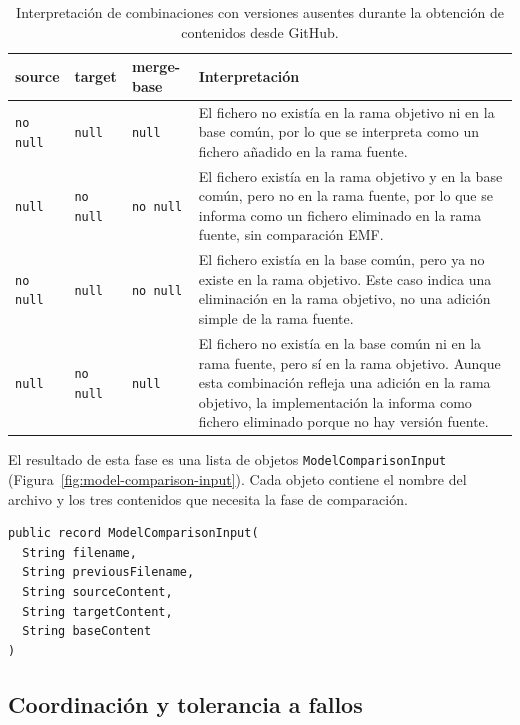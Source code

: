 \documentclass[11pt]{article}
\begin{document}
\begin{table}[h]
\centering
\begin{tabular}{|p{}|p{}|p{}|p{}|}
\hline
\textbf{source} & \textbf{target} & \textbf{merge-base} & \textbf{Interpretación} \\
\hline
\texttt{no null} & \texttt{null} & \texttt{null} & El fichero no existía en la rama objetivo ni en la base común, por lo que se interpreta como un fichero añadido en la rama fuente. \\
\hline
\texttt{null} & \texttt{no null} & \texttt{no null} & El fichero existía en la rama objetivo y en la base común, pero no en la rama fuente, por lo que se informa como un fichero eliminado en la rama fuente, sin comparación EMF. \\
\hline
\texttt{no null} & \texttt{null} & \texttt{no null} & El fichero existía en la base común, pero ya no existe en la rama objetivo. Este caso indica una eliminación en la rama objetivo, no una adición simple de la rama fuente. \\
\hline
\texttt{null} & \texttt{no null} & \texttt{null} & El fichero no existía en la base común ni en la rama fuente, pero sí en la rama objetivo. Aunque esta combinación refleja una adición en la rama objetivo, la implementación la informa como fichero eliminado porque no hay versión fuente. \\
\hline
\end{tabular}
\caption{Interpretación de combinaciones con versiones ausentes durante la obtención de contenidos desde GitHub.}
\label{tab:null-file-versions}
\end{table}

El resultado de esta fase es una lista de objetos \texttt{ModelComparisonInput} (Figura~\ref{fig:model-comparison-input}). Cada objeto contiene el nombre del archivo y los tres contenidos que necesita la fase de comparación.

\begin{lstlisting}[caption={Estructura de \texttt{ModelComparisonInput}.},label={lst:model-comparison-input}]
public record ModelComparisonInput(
  String filename,
  String previousFilename,
  String sourceContent,
  String targetContent,
  String baseContent
)
\end{lstlisting}

\subsection{Coordinación y tolerancia a fallos}
\end{document}
